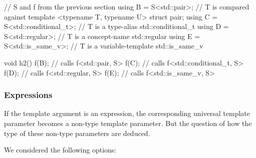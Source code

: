\documentclass{wg21}
\begin{document}
\begin{colorblock}
// S and f from the previous section
using B = S<std::pair>; // T is compared against template <typename T, typename U> struct pair;
using C = S<std::conditional_t>; // T is a type-alias std::conditional_t
using D = S<std::regular>; // T is a concept-name std::regular
using E = S<std::is_same_v>; // T is a variable-template std::is_same_v

void h2() {
  f(B{}); // calls f<std::pair, S>
  f(C{}); // calls f<std::conditional_t, S>
  f(D{}); // calls f<std::regular, S>
  f(E{}); // calls f<std::is_same_v, S>
}
\end{colorblock}

\subsubsection{Expressions}

If the template argument is an expression, the corresponding universal template parameter becomes a non-type template parameter.
But the question of how the type of these non-type parameters are deduced.

We considered the following options:
\end{document}
